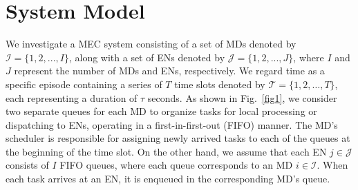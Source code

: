 \documentclass[10pt, journal,letterpaper]{IEEEtran}
\begin{document}
\section{System Model} 
\label{section:III}
\label{sec:latexhints}
\newcount\LTGbeginlineexample
\newcount\LTGendlineexample
\newenvironment{ltgexample}%
{\LTGbeginlineexample=\numexpr\inputlineno+1\relax}%
{\LTGendlineexample=\numexpr\inputlineno-1\relax%
	\tcbinputlisting{%
		listing only,
		listing file=\currfilepath,
		colback=green!5!white,
		colslot=green!25,
		coltitle=black!90,
		coltext=black!90,
		left=8mm,
		title=Corresponding \LaTeX{} code of \texttt{\currfilepath},
		listing options={%
			slot=none,
			language={[LaTeX]TeX},
			escapeinside={},
			firstline=\the\LTGbeginlineexample,
			lastline=\the\LTGendlineexample,
			firstnumber=\the\LTGbeginlineexample,
			basewidth=.5em,
			aboveskip=0mm,
			belowskip=0mm,
			numbers=left,
			xleftmargin=0mm,
			numberstyle=\tiny,
			numbersep=8pt%
		}
	}
}%
We investigate a MEC system consisting of a set of MDs denoted by $\mathcal{I} = \{1, 2, ..., I\}$, along with a set of ENs denoted by $\mathcal{J} = \{1, 2, ..., J\}$, where $I$ and $J$ represent the number of MDs and ENs, respectively. We regard time as a specific episode containing a series of $T$ time slots denoted by $\mathcal{T} = \{1, 2, \ldots, T\}$, each representing a duration of $\tau$ seconds. As shown in Fig.~\ref{fig1}, we consider two separate queues for each MD to organize tasks for local processing or dispatching to ENs, operating in a first-in-first-out (FIFO) manner. The MD's scheduler is responsible for assigning newly arrived tasks to each of the queues at the beginning of the time slot. On the other hand, we assume that each EN $j \in \mathcal{J}$ consists of $I$ FIFO queues, where each queue corresponds to an MD $i \in \mathcal{I}$. When each task arrives at an EN, it is enqueued in the corresponding MD's queue. %
\end{document}
